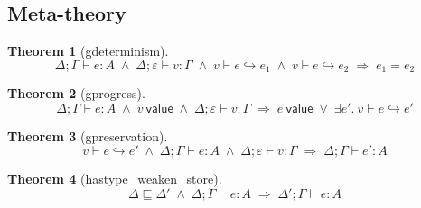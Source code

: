 \documentclass[10pt]{article}
\newtheorem{theorem}{Theorem}[section]
\newcommand{\tp}{\varepsilon}
\newcommand{\Val}{\mathsf{value}}
\newcommand{\step}[3]{#1 \vdash #2 \hookrightarrow #3}
\newcommand{\msteps}[3]{#1 \vdash #2 \hookrightarrow^{*} #3}
\newcommand{\hast}[4]{#1; #2 \vdash #3 : #4}
\newcommand{\storele}{\sqsubseteq}
\begin{document}

\subsection{Meta-theory}

\begin{theorem}[\textsf{gdeterminism}]
\[
\hast{\Delta}{\Gamma}{e}{A} \;\wedge\; \hast{\Delta}{\tp}{v}{\Gamma} \;\wedge\;
\step{v}{e}{e_1} \;\wedge\; \step{v}{e}{e_2} \;\Longrightarrow\; e_1 = e_2
\]
\end{theorem}

\begin{theorem}[\textsf{gprogress}]
\[
\hast{\Delta}{\Gamma}{e}{A} \;\wedge\; v\ \Val \;\wedge\; \hast{\Delta}{\tp}{v}{\Gamma}
\;\Longrightarrow\; e\ \Val \;\vee\; \exists e'.\ \step{v}{e}{e'}
\]
\end{theorem}

\begin{theorem}[\textsf{gpreservation}]
\[
\step{v}{e}{e'} \;\wedge\; \hast{\Delta}{\Gamma}{e}{A} \;\wedge\; \hast{\Delta}{\tp}{v}{\Gamma}
\;\Longrightarrow\; \hast{\Delta}{\Gamma}{e'}{A}
\]
\end{theorem}

\begin{theorem}[\textsf{hastype\_weaken\_store}]
\[
\Delta \storele \Delta' \;\wedge\; \hast{\Delta}{\Gamma}{e}{A} \;\Longrightarrow\; \hast{\Delta'}{\Gamma}{e}{A}
\]
\end{theorem}
\end{document}
